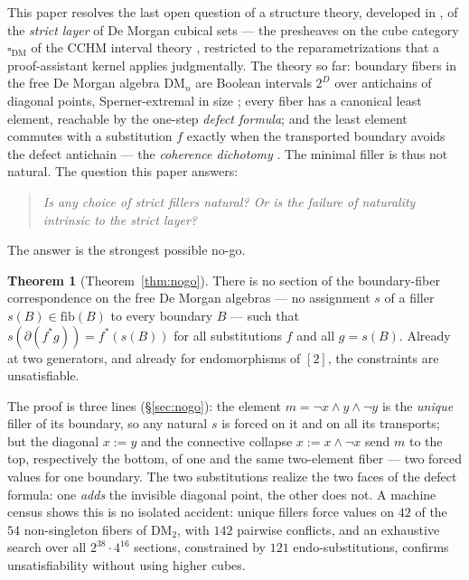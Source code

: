 \documentclass[11pt]{amsart}
\theoremstyle{definition}
\newtheorem*{thmstar}{Theorem}
\newcommand{\DM}{\mathrm{DM}}
\newcommand{\cube}{\square_{\mathrm{DM}}}
\newcommand{\bnd}{\partial}
\begin{document}
This paper resolves the last open question of a structure theory,
developed in \cite{DMFibers, StrictDM, Kleene}, of the \emph{strict
layer} of De Morgan cubical sets --- the presheaves on the cube
category $\cube$ of the CCHM interval theory \cite{CCHM}, restricted
to the reparametrizations that a proof-assistant kernel applies
judgmentally.  The theory so far: boundary fibers in the free De
Morgan algebra $\DM_n$ are Boolean intervals $2^{D}$ over
antichains of diagonal points, Sperner-extremal in size
\cite{DMFibers}; every fiber has a canonical least element,
reachable by the one-step \emph{defect formula}; and the least
element commutes with a substitution $f$ exactly when the
transported boundary avoids the defect antichain --- the
\emph{coherence dichotomy} \cite{StrictDM}.  The minimal filler is
thus not natural.  The question this paper answers:

\begin{quote}
  \emph{Is any choice of strict fillers natural?  Or is the failure
  of naturality intrinsic to the strict layer?}
\end{quote}

The answer is the strongest possible no-go.

\begin{thmstar}[Theorem~\ref{thm:nogo}]
  There is no section of the boundary-fiber correspondence on the
  free De Morgan algebras --- no assignment $s$ of a filler
  $s(B) \in \mathrm{fib}(B)$ to every boundary $B$ --- such that
  $s(\bnd(f^{*}g)) = f^{*}(s(B))$ for all substitutions $f$ and all
  $g = s(B)$.  Already at two generators, and already for
  endomorphisms of $[2]$, the constraints are unsatisfiable.
\end{thmstar}

The proof is three lines (\S\ref{sec:nogo}): the element
$m = \neg x \wedge y \wedge \neg y$ is the \emph{unique} filler of
its boundary, so any natural $s$ is forced on it and on all its
transports; but the diagonal $x := y$ and the connective collapse
$x := x \wedge \neg x$ send $m$ to the top, respectively the
bottom, of one and the same two-element fiber --- two forced values
for one boundary.  The two substitutions realize the two faces of
the defect formula: one \emph{adds} the invisible diagonal point,
the other does not.  A machine census shows this is no isolated
accident: unique fillers force values on $42$ of the $54$
non-singleton fibers of $\DM_2$, with $142$ pairwise conflicts, and
an exhaustive search over all
$2^{38} \cdot 4^{16}$ sections, constrained by $121$
endo-substitutions, confirms unsatisfiability without using
higher cubes.
\end{document}
